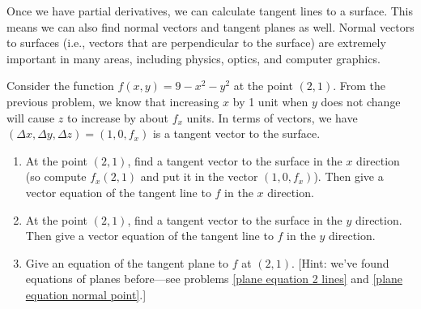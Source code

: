 Once we have partial derivatives, we can calculate tangent lines to a surface. This means we can also find normal vectors and tangent planes as well.  Normal vectors to surfaces (i.e., vectors that are perpendicular to the surface) are extremely important in many areas, including physics, optics, and computer graphics.
\begin{problem} \label{cake plane introduction}%
 Consider the function $f(x,y)=9-x^2-y^2$ at the point $(2,1)$. From the previous problem, we know that increasing $x$ by 1 unit when $y$ does not change will cause $z$ to increase by about $f_x$ units. In terms of vectors, we have $(\Delta x, \Delta y, \Delta z) = (1,0,f_x)$ is a tangent vector to the surface. 
\begin{enumerate}
 \item At the point $(2,1)$, find a tangent vector to the surface in the $x$ direction (so compute $f_x(2,1)$ and put it in the vector $(1,0,f_x)$). Then give a vector equation of the tangent line to $f$ in the $x$ direction.
 \item At the point $(2,1)$, find a tangent vector to the surface in the $y$ direction. 
Then give a vector equation of the tangent line to $f$ in the $y$ direction.
 \item Give an equation of the tangent plane to $f$ at $(2,1)$. [Hint: we've found equations of planes before---see problems \ref{plane equation 2 lines} and \ref{plane equation normal point}.]
\end{enumerate}
\end{problem}

